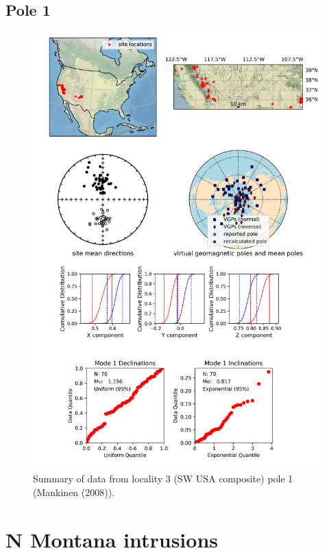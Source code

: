 \subsection{Pole 1}


\begin{figure}[H]
\centering
\includegraphics[width=5 in]{./3/1/pole_summary.png}
\caption{Summary of data from locality 3 (SW USA composite) pole 1 (Mankinen (2008)).}
\end{figure}

\section{N Montana intrusions}
